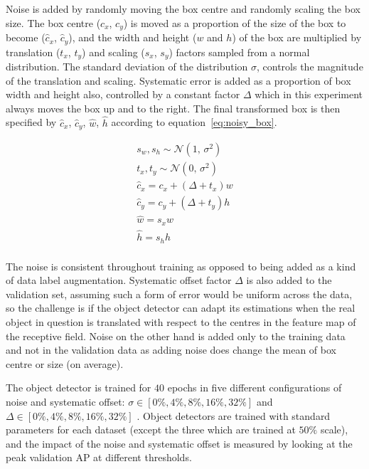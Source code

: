 Noise is added by randomly moving the box centre and randomly scaling the box size. The box centre ($c_x$, $c_y$) is moved as a proportion of the size of the box to become ($\hat{c}_x$, $\hat{c}_y$), and the width and height ($w$ and $h$) of the box are multiplied by translation ($t_x$, $t_y$) and scaling ($s_x$, $s_y$) factors sampled from a normal distribution. The standard deviation of the distribution $\sigma$, controls the magnitude of the translation and scaling. Systematic error is added as a proportion of box width and height also, controlled by a constant factor $\Delta$ which in this experiment always moves the box up and to the right. The final transformed box is then specified by $\hat{c}_x$, $\hat{c}_y$, $\hat{w}$, $\hat{h}$ according to equation~\ref{eq:noisy_box}. 

\begin{equation*}
\begin{split}
    s_w, s_h \sim \mathcal{N}(1,\,\sigma^{2})\\
    t_x, t_y \sim \mathcal{N}(0,\,\sigma^{2})\\
    \hat{c}_x = c_x + (\Delta + t_x) w\\
    \hat{c}_y = c_y + (\Delta + t_y) h\\
    \hat{w} = s_x w\\
    \hat{h} = s_h h\\
\end{split}
\label{eq:noisy_box}
\end{equation*}

The noise is consistent throughout training as opposed to being added as a kind of data label augmentation. Systematic offset factor $\Delta$ is also added to the validation set, assuming such a form of error would be uniform across the data, so the challenge is if the object detector can adapt its estimations when the real object in question is translated with respect to the centres in the feature map of the receptive field. Noise on the other hand is added only to the training data and not in the validation data as adding noise does change the mean  of box centre or size (on average).

The object detector is trained for $40$ epochs in five different configurations of noise and systematic offset: $\sigma \in [0\%, 4\%, 8\%, 16\%, 32\%]$ and $\Delta \in [0\%, 4\%, 8\%, 16\%, 32\%]$ . Object detectors are trained with standard parameters for each dataset (except the three which are trained at $50\%$ scale), and the impact of the noise and systematic offset is measured by looking at the peak validation \gls{AP} at different thresholds.

